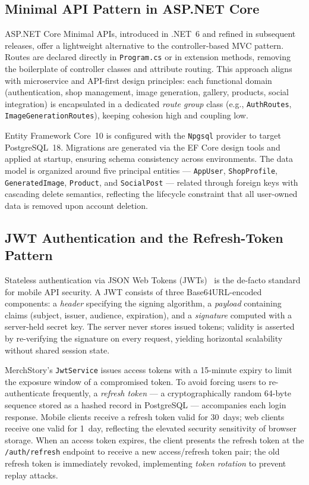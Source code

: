 \documentclass[12pt, a4paper]{report}
\begin{document}
\subsection{Minimal API Pattern in ASP.NET Core}

ASP.NET Core Minimal APIs, introduced in .NET~6 and refined in subsequent
releases, offer a lightweight alternative to the controller-based MVC pattern.
Routes are declared directly in \texttt{Program.cs} or in extension methods,
removing the boilerplate of controller classes and attribute routing.  This
approach aligns with microservice and API-first design principles: each
functional domain (authentication, shop management, image generation, gallery,
products, social integration) is encapsulated in a dedicated \emph{route group}
class (e.g., \texttt{AuthRoutes}, \texttt{ImageGenerationRoutes}), keeping
cohesion high and coupling low.

\medskip\noindent
Entity Framework Core~10 is configured with the \texttt{Npgsql} provider to
target PostgreSQL~18.  Migrations are generated via the EF Core design tools
and applied at startup, ensuring schema consistency across environments.  The
data model is organized around five principal entities ---
\texttt{AppUser}, \texttt{ShopProfile}, \texttt{GeneratedImage},
\texttt{Product}, and \texttt{SocialPost} --- related through foreign keys
with cascading delete semantics, reflecting the lifecycle constraint that all
user-owned data is removed upon account deletion.

\subsection{JWT Authentication and the Refresh-Token Pattern}

Stateless authentication via JSON Web Tokens (JWTs)~\cite{jones2015rfc7519}
is the de-facto standard for mobile API security.  A JWT consists of three
Base64URL-encoded components: a \emph{header} specifying the signing
algorithm, a \emph{payload} containing claims (subject, issuer, audience,
expiration), and a \emph{signature} computed with a server-held secret key.
The server never stores issued tokens; validity is asserted by re-verifying
the signature on every request, yielding horizontal scalability without
shared session state.

\medskip\noindent
MerchStory's \texttt{JwtService} issues access tokens with a 15-minute
expiry to limit the exposure window of a compromised token.  To avoid
forcing users to re-authenticate frequently, a \emph{refresh token} ---
a cryptographically random 64-byte sequence stored as a hashed record in
PostgreSQL --- accompanies each login response.  Mobile clients receive a
refresh token valid for 30~days; web clients receive one valid for 1~day,
reflecting the elevated security sensitivity of browser storage.  When
an access token expires, the client presents the refresh token at the
\texttt{/auth/refresh} endpoint to receive a new access/refresh token pair;
the old refresh token is immediately revoked, implementing
\emph{token rotation} to prevent replay attacks.
\end{document}
